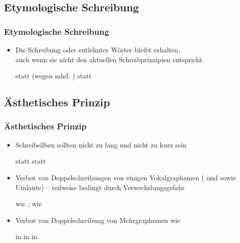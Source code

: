 \subsection{Etymologische Schreibung}


\begin{frame}
\frametitle{Etymologische Schreibung}

\begin{itemize}
	\item Die Schreibung  oder entlehnter Wörter bleibt erhalten,\\
          auch wenn sie nicht den aktuellen Schreibprinzipien entspricht.
		
	  \eal
          \ex {} statt  (wegen mhd. )
	  \ex {} statt 
          \zl

\end{itemize}


\end{frame}


\subsection{Ästhetisches Prinzip}


\begin{frame}
\frametitle{Ästhetisches Prinzip}

\begin{itemize}
	\item Schreibsilben sollten nicht zu lang und nicht zu kurz sein
	
	  \eal
          \ex {} statt 
	  \ex {} statt 
          \zl
	
	\item Verbot von Doppelschreibungen von einigen Vokalgraphemen ( und  sowie Umlaute) -- teilweise bedingt durch Verwechslungsgefahr
	
	  \ea
           wie ;  wie 
          \z
	
	\item Verbot von Doppelschreibung von Mehrgraphemen wie
	
	  \eal
          \ex {} in 
	  \ex {} in  
	  \ex {} in 
          \zl
	
\end{itemize}


\end{frame}


